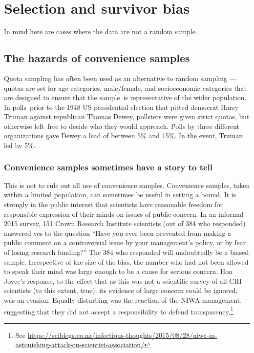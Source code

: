 \documentclass[
  10pt,
  b5paper]{book}
\begin{document}
\hypertarget{selection-and-survivor-bias}{%
\chapter{Selection and survivor bias}\label{selection-and-survivor-bias}}

In mind here are cases where the data are not a random sample.

\hypertarget{the-hazards-of-convenience-samples}{%
\section{The hazards of convenience samples}\label{the-hazards-of-convenience-samples}}

Quota sampling has often been used as an alternative to random
sampling --- quotas are set for age categories, male/female,
and socioeconomic categories that are designed to ensure that
the sample~is representative of the wider population.
In polls~prior to the 1948 US presidential election that
pitted democrat Harry Truman against republican Thomas Dewey,
pollsters were given strict quotas, but otherwise left~free to
decide who they would approach. Polls by three different
organizations gave Dewey a lead of between 5\% and 15\%. In the
event, Truman led by 5\%.

\hypertarget{convenience-samples-sometimes-have-a-story-to-tell}{%
\subsection*{Convenience samples sometimes have a story to tell}\label{convenience-samples-sometimes-have-a-story-to-tell}}

This is not to rule out all use of convenience samples.
Convenience samples, taken within a limited population,
can sometimes be useful in setting a bound.
It is strongly in the public interest that scientists have
reasonable freedom for responsible expression of their minds
on issues of public concern. In an informal 2015 survey, 151
Crown Research Institute scientists (out of 384 who responded)
answered yes to the question ``Have you ever been prevented
from making a public comment on a controversial issue by your
management's policy, or by fear of losing research funding?''
The 384 who responded will undoubtedly be a biased sample.
Irrespective of the size of the bias, the number who had not
been allowed to speak their mind was large enough to be a cause
for serious concern. Hon Joyce's response, to the effect that
as this was not a scientific survey of all CRI scientists
(to this extent, true), its evidence of large concern could be
ignored, was an evasion. Equally disturbing was the reaction
of the NIWA management, suggesting that they did not accept a
responsibility to defend transparency.\footnote{See \url{https://sciblogs.co.nz/infectious-thoughts/2015/08/28/niwa-in-astonishing-attack-on-scientist-association/}}
\end{document}
